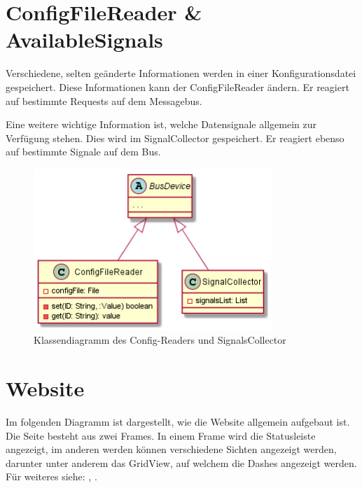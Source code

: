 \documentclass[entwurf.tex]{subfiles}
\begin{document}
  	\newpage
  	\section{ConfigFileReader \& AvailableSignals}
  		Verschiedene, selten geänderte Informationen werden in einer Konfigurationsdatei gespeichert. Diese Informationen kann der ConfigFileReader ändern. Er reagiert auf bestimmte Requests auf dem Messagebus.
  		
  		Eine weitere wichtige Information ist, welche Datensignale allgemein zur Verfügung stehen. Dies wird im SignalCollector gespeichert. Er reagiert ebenso auf bestimmte Signale auf dem Bus.
  		\begin{figure}[H]
  			\begin{center}
 				\includegraphics[width=0.8\textwidth]{diagrams/Classes_Config.png}
  				\caption{Klassendiagramm des Config-Readers und SignalsCollector}
  			\end{center}
  		\end{figure}
  	

	\newpage
  	\section{Website}
  	\label{Class:Website}
		Im folgenden Diagramm ist dargestellt, wie die Website allgemein aufgebaut ist. Die Seite besteht aus zwei Frames. In einem Frame wird die Statusleiste angezeigt, im anderen werden können verschiedene Sichten angezeigt werden, darunter unter anderem das GridView, auf welchem die Dashes angezeigt werden. Für weiteres siehe: , .
		
\end{document}
